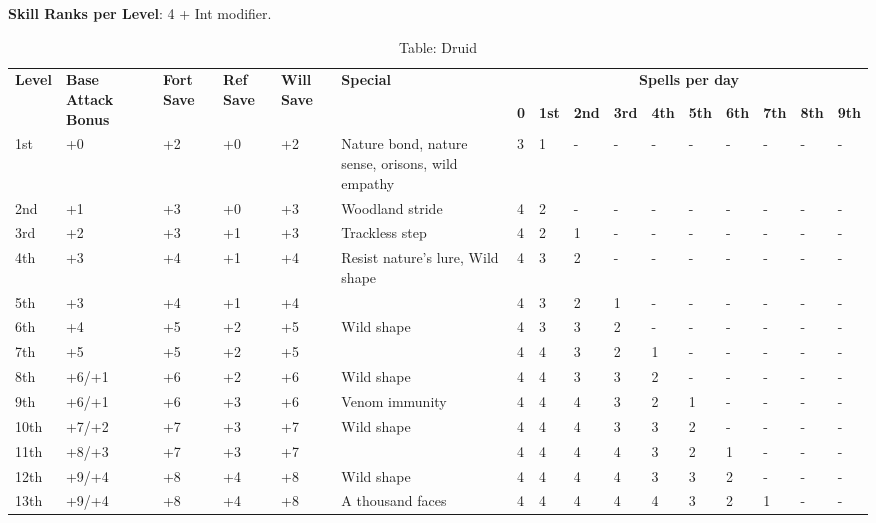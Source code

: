 \textbf{Skill Ranks per Level}: 4 + Int modifier.
\begin{table*}[]
\caption{Table: Druid}
\sffamily
\setlength{\tabcolsep}{1pt}
\begin{tabularx}{\linewidth}{lp{6em}p{2.5em}p{2.5em}p{2.5em}Xllllllllll}
\multirow{2}{*}{\textbf{Level}} & \multirow{2}{*}{\parbox{5em}{\textbf{Base Attack Bonus}}} & \multirow{2}{*}{\parbox{1.5em}{\textbf{Fort Save}}} & \multirow{2}{*}{\parbox{1.5em}{\textbf{Ref Save}}} & \multirow{2}{*}{\parbox{1.5em}{\textbf{Will Save}}} & \textbf{Special}     & \multicolumn{10}{c}{\textbf{Spells per day}} \\
                       &                                    &                            &                           &                            &                                                                                                  &  \textbf{0} & \textbf{1st} & \textbf{2nd} & \textbf{3rd} & \textbf{4th} & \textbf{5th} & \textbf{6th} & \textbf{7th} & \textbf{8th} & \textbf{9th} \\
1st & +0 & +2 & +0 & +2 & Nature bond, nature sense, orisons, wild empathy & 3 & 1 & - & - & - & - & - & - & - & -\\
2nd & +1 & +3 & +0 & +3 & Woodland stride & 4 & 2 & - & - & - & - & - & - & - & -\\
3rd & +2 & +3 & +1 & +3 & Trackless step & 4 & 2 & 1 & - & - & - & - & - & - & -\\
4th & +3 & +4 & +1 & +4 & Resist nature's lure, Wild shape & 4 & 3 & 2 & - & - & - & - & - & - & -\\
5th & +3 & +4 & +1 & +4 &  & 4 & 3 & 2 & 1 & - & - & - & - & - & -\\
6th & +4 & +5 & +2 & +5 & Wild shape & 4 & 3 & 3 & 2 & - & - & - & - & - & -\\
7th & +5 & +5 & +2 & +5 &  & 4 & 4 & 3 & 2 & 1 & - & - & - & - & -\\
8th & +6/+1 & +6 & +2 & +6 & Wild shape & 4 & 4 & 3 & 3 & 2 & - & - & - & - & -\\
9th & +6/+1 & +6 & +3 & +6 & Venom immunity & 4 & 4 & 4 & 3 & 2 & 1 & - & - & - & -\\
10th & +7/+2 & +7 & +3 & +7 & Wild shape & 4 & 4 & 4 & 3 & 3 & 2 & - & - & - & -\\
11th & +8/+3 & +7 & +3 & +7 &  & 4 & 4 & 4 & 4 & 3 & 2 & 1 & - & - & -\\
12th & +9/+4 & +8 & +4 & +8 & Wild shape & 4 & 4 & 4 & 4 & 3 & 3 & 2 & - & - & -\\
13th & +9/+4 & +8 & +4 & +8 & A thousand faces & 4 & 4 & 4 & 4 & 4 & 3 & 2 & 1 & - & -\\

\end{tabularx}
\end{table*}
